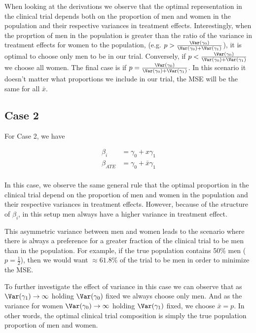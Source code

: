 When looking at the derivations we observe that the optimal representation in the clinical trial depends both on the proportion of men and women in the population and their respective variances in treatment effects.
Interestingly, when the proprtion of men in the population is greater than the ratio of the variance in treatment effects for women to the population, (e.g.
$p > \frac{\Var(\gamma_0)}{ \Var(\gamma_0) + \Var(\gamma_1)}$), it is optimal to choose only men to be in our trial. 
Conversely, if $p < \frac{\Var(\gamma_0)}{ \Var(\gamma_0) + \Var(\gamma_1)}$ we choose all women.
The final case is if $p = \frac{\Var(\gamma_0)}{ \Var(\gamma_0) + \Var(\gamma_1)}$. 
In this scenario it doesn't matter what proportions we include in our trial, the MSE will be the same for all $\bar{x}$.

\subsection*{Case 2}

For Case 2, we have 

\begin{align*}
	\beta_i &=  \gamma_0 + x \gamma_1 \\
	\beta_{ATE} &=  \gamma_0 + \bar{x} \gamma_1 \\
\end{align*}


In this case, we observe the same general rule that the optimal proportion in the clinical trial depend on the proportion of men and women in the population and their respective variances in treatment effects.
However, because of the structure of $\beta_ i$, in this setup men always have a higher variance in treatment effect.

This asymmetric variance between men and women leads to the scenario where there is always a preference for a greater fraction of the clinical trial to be men than in the population. 
For example, if the true population contains 50\% men ($p = \frac{1}{2}$), then we would want $\approx 61.8 \%$ of the trial to be men in order to minimize the MSE.

To further investigate the effect of variance in this case we can observe that as $\Var(\gamma_1) \to \infty$ holding $\Var(\gamma_0)$ fixed we always choose only men.
And as the variance for women $\Var(\gamma_0) \to \infty$ holding $\Var(\gamma_1)$ fixed, we choose $\bar{x} = p$. In other words, the optimal clinical trial composition is simply the true population proportion of men and women.

